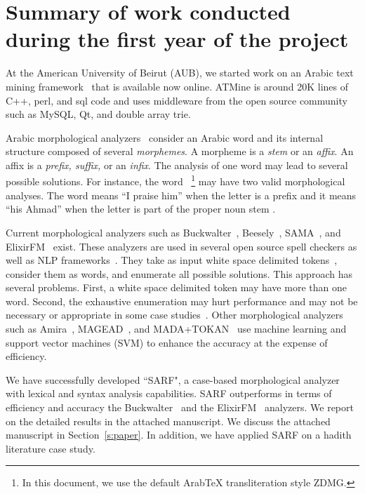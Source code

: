 \documentclass[12pt]{article}
\begin{document}
\section{Summary of work conducted during the first year of the project}
\label{s:prelim}

At the American University of Beirut (AUB), we
started work on an Arabic text mining framework~\cite{ATMine09}
that is available now online. 
ATMine is around 20K lines of C++, perl, and sql code and uses 
middleware from the open source community such as MySQL, Qt, and 
double array trie.


Arabic morphological analyzers~\cite{Sughaiyer:04}
consider an Arabic word and its internal structure composed of 
several {\em morphemes}. 
A morpheme is a {\em stem} or an {\em affix}.
An affix is a {\em prefix, suffix,} or an {\em infix}.
The analysis of one word may lead to several possible
solutions.
\vocalize
For instance, the word 
~\footnote{In this document, we use the default 
ArabTeX transliteration style ZDMG.}
may have two valid morphological analyses. 
The word means ``I praise him'' when
the letter  is a prefix and  it means
``his Ahmad'' when 
the letter  is part of the proper noun stem 
.

Current morphological analyzers such as 
Buckwalter~\cite{Buckwalter:02},
Beesely~\cite{Beesley:01}, SAMA~\cite{Kulick:10},
and ElixirFM~\cite{Otakar:07} exist.
These analyzers are used in several open source spell checkers as 
well as NLP frameworks~\cite{Col09}.
They take as input white space delimited tokens~\cite{Kulick:10},
consider them as words,
and enumerate all possible solutions. 
This approach has several problems. 
First, a white space delimited token may have 
more than one word.
Second, the exhaustive enumeration may hurt performance and may
not be necessary or appropriate
in some case studies~\cite{Maamouri:10}. 
Other morphological analyzers such as 
Amira~\cite{Diab:07,Benajiba:07},
MAGEAD~\cite{Habash:05}, and MADA+TOKAN~\cite{Habash:09} 
use machine learning and support vector machines (SVM) 
to enhance the accuracy at the expense of efficiency.

We have successfully developed ``SARF", a case-based morphological 
analyzer with lexical and syntax analysis capabilities. 
SARF outperforms in terms of efficiency and accuracy 
the Buckwalter~\cite{Tim04} and the ElixirFM~\cite{Otakar:07} 
analyzers. 
We report on the detailed results in the attached manuscript.
We discuss the attached manuscript in Section~\ref{s:paper}. 
In addition, we have applied SARF on a hadith literature case study.
\end{document}
